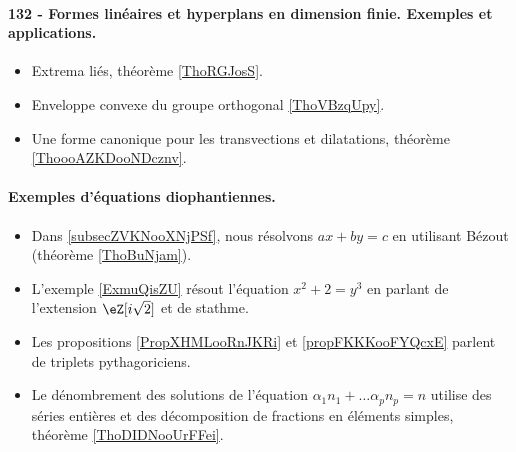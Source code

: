 \paragraph{132 - Formes linéaires et hyperplans en dimension finie. Exemples et applications.}
\begin{itemize}
    \item Extrema liés, théorème \ref{ThoRGJosS}.
    \item Enveloppe convexe du groupe orthogonal \ref{ThoVBzqUpy}.
    \item Une forme canonique pour les transvections et dilatations, théorème \ref{ThoooAZKDooNDcznv}.
\end{itemize}
\paragraph{Exemples d’équations diophantiennes.}
\begin{itemize}
    \item Dans \ref{subsecZVKNooXNjPSf}, nous résolvons \( ax+by=c\) en utilisant Bézout (théorème \ref{ThoBuNjam}).
    \item L'exemple \ref{ExmuQisZU} résout l'équation \( x^2+2=y^3\) en parlant de l'extension \( \eZ[i\sqrt{2}]\) et de stathme.
    \item Les propositions \ref{PropXHMLooRnJKRi} et \ref{propFKKKooFYQcxE} parlent de triplets pythagoriciens.
    \item Le dénombrement des solutions de l'équation \( \alpha_1 n_1+\ldots \alpha_pn_p=n\) utilise des séries entières et des décomposition de fractions en éléments simples, théorème \ref{ThoDIDNooUrFFei}.
\end{itemize}
